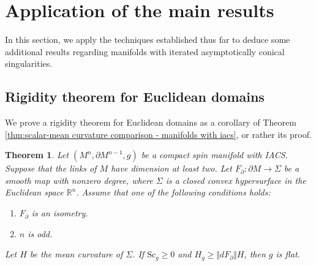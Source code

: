 \documentclass[12pt, reqno]{amsart}
\theoremstyle{plain} %
\newtheorem{theorem}{Theorem}[section]
\theoremstyle{definition}
\theoremstyle{remark}
\numberwithin{equation}{section}
\newcommand{\onorm}[1]{\Vert #1 \Vert}
\newcommand{\bnd}[1]{\partial #1}
\newcommand{\field}[1]{\mathbb{#1}}
\newcommand{\R}{\field{R}}
\newcommand{\Sc}{\mathrm{Sc}}
\newcommand{\tdim}{n} %
\begin{document}
\section{Application of the main results}\label{sec:applications}
In this section, we apply the techniques established thus far to deduce some additional results regarding manifolds with iterated asymptotically conical singularities.

\subsection{Rigidity theorem for Euclidean domains}
We prove a rigidity theorem for Euclidean domains as a corollary of Theorem \ref{thm:scalar-mean curvature comparison - manifolds with iacs}, or rather its proof.
\begin{theorem}
    Let \((M^{\tdim},\bnd{M}^{\tdim-1},g)\) be a compact spin manifold with IACS.
    Suppose that the links of \(M\) have dimension at least two.
    Let \(F_\partial\colon\partial M\to\Sigma\) be a smooth map with nonzero degree, where \(\Sigma\) is a closed convex hypersurface in the Euclidean space $\R^n$.
    Assume that one of the following conditions holds:
    \begin{enumerate}[label=\((\roman*)\)]
        \item \(F_\partial\) is an isometry.
        \item \(n\) is odd.
    \end{enumerate}
    Let $H$ be the mean curvature of $\Sigma$. If \(\Sc_{g} \geq 0\) and \(H_{g} \geq \onorm{dF_\partial} H\), then \(g\) is flat.
\end{theorem}
\end{document}
